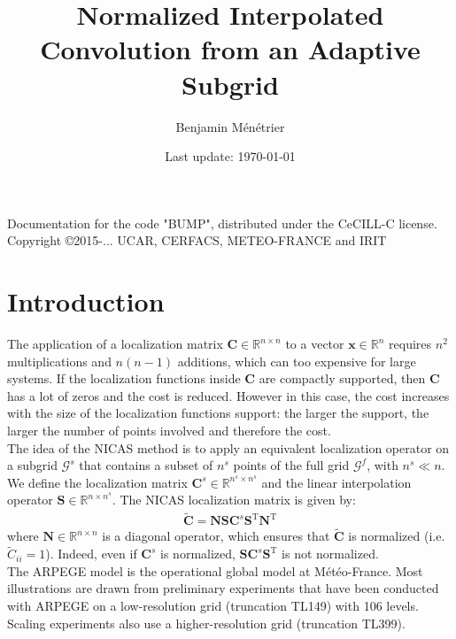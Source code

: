\documentclass[12pt]{scrartcl}
\begin{document}
\title{\vspace{-1.2cm}Normalized Interpolated Convolution from an Adaptive Subgrid}
\author{Benjamin Ménétrier}
\date{Last update: \today\vspace{-0.5cm}}

\thispagestyle{empty}

\maketitle

\begin{center}
Documentation for the code "BUMP", distributed under the CeCILL-C license.\\
Copyright \copyright 2015-... UCAR, CERFACS, METEO-FRANCE and IRIT
\end{center}
  
\tableofcontents

\clearpage

\section{Introduction}
The application of a localization matrix $\mathbf{C} \in \mathbb{R}^{n \times n}$ to a vector $\mathbf{x} \in \mathbb{R}^n$ requires $n^2$ multiplications and $n(n-1)$ additions, which can too expensive for large systems. If the localization functions inside $\mathbf{C}$ are compactly supported, then $\mathbf{C}$ has a lot of zeros and the cost is reduced. However in this case, the cost increases with the size of the localization functions support: the larger the support, the larger the number of points involved and therefore the cost.\\
$  $\\
The idea of the NICAS method is to apply an equivalent localization operator on a subgrid $\mathcal{G}^s$ that contains a subset of $n^s$ points of the full grid $\mathcal{G}^f$, with $n^s \ll n$. We define the localization matrix $\mathbf{C}^s \in \mathbb{R}^{n^s \times n^s}$ and the linear interpolation operator $\mathbf{S} \in \mathbb{R}^{n \times n^s}$. The NICAS localization matrix is given by:
\begin{align}
\label{eq:nicas}
\widetilde{\mathbf{C}} = \mathbf{N} \mathbf{S} \mathbf{C}^s \mathbf{S}^\mathrm{T} \mathbf{N}^\mathrm{T}
\end{align}
where $\mathbf{N} \in \mathbb{R}^{n \times n}$ is a diagonal operator, which ensures that $\widetilde{\mathbf{C}}$ is normalized (i.e. $\widetilde{C}_{ii} = 1$). Indeed, even if $\mathbf{C}^s$ is normalized, $\mathbf{S} \mathbf{C}^s \mathbf{S}^\mathrm{T}$ is not normalized.\\
$  $\\
The ARPEGE model is the operational global model at Météo-France. Most illustrations are drawn from preliminary experiments that have been conducted with ARPEGE on a low-resolution grid (truncation TL149) with 106 levels. Scaling experiments also use a higher-resolution grid (truncation TL399).
\end{document}

